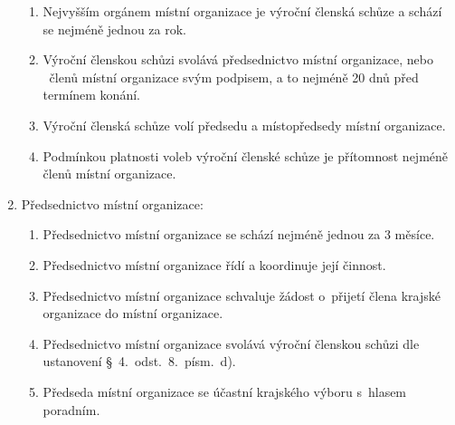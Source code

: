 \documentclass[a4paper]{article}
\begin{document}
\begin{enumerate}
\begin{enumerate}
        \item Nejvyšším orgánem místní organizace je výroční členská schůze a
            schází se nejméně jednou za rok.

        \item Výroční členskou schůzi svolává předsednictvo místní organizace,
            nebo ~členů místní organizace svým podpisem, a to
            nejméně 20 dnů před termínem konání.

        \item Výroční členská schůze volí předsedu a místopředsedy místní
            organizace.

        \item Podmínkou platnosti voleb výroční členské schůze
            je přítomnost nejméně  členů místní organizace.
        \end{enumerate}

    \item Předsednictvo místní organizace:
        \begin{enumerate}
        \item Předsednictvo místní organizace se schází nejméně jednou za
            3 měsíce.

        \item Předsednictvo místní organizace řídí a koordinuje její činnost.

        \item Předsednictvo místní organizace schvaluje žádost o~přijetí
            člena krajské organizace do místní organizace.

        \item Předsednictvo místní organizace svolává výroční členskou
            schůzi dle ustanovení \S~4.~odst.~8.~písm.~d).

        \item Předseda místní organizace se účastní krajského výboru
            s~hlasem poradním.
        \end{enumerate}
    \end{enumerate}
\end{document}

